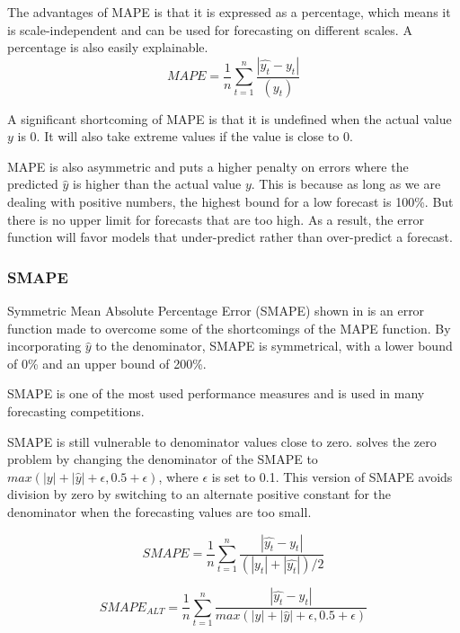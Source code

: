The advantages of MAPE is that it is expressed as a percentage, which means
it is scale-independent and can be used for forecasting on different scales.
A percentage is also easily explainable.
\begin{equation}
  \label{eq:Mape}
  MAPE = \frac{1}{n} \sum_{t=1}^n \frac{|\hat{y_t} - y_t|}{(y_t)}
\end{equation}

A significant shortcoming of MAPE is that it is undefined when the actual value $y$ is 0.
It will also take extreme values if the value is close to 0.

MAPE is also asymmetric and puts a higher penalty on errors where the predicted
$\hat{y}$ is higher than the actual value $y$.
This is because as long as we are dealing with positive numbers,
the highest bound for a low forecast is 100\%. But there is no upper limit
for forecasts that are too high. As a result, the error function will
favor models that under-predict rather than over-predict a forecast.

\subsubsection{SMAPE}
Symmetric Mean Absolute Percentage Error (SMAPE) shown in 
is an error function made to overcome some of the shortcomings of the MAPE function.
By incorporating $\hat{y}$ to the denominator, SMAPE is symmetrical,
with a lower bound of 0\% and an upper bound of 200\%.

SMAPE is one of the most used performance measures and is used in many forecasting competitions.

SMAPE is still vulnerable to denominator values close to zero.
\cite{Hewamalage2021} solves the zero problem by changing the denominator
of the SMAPE to $max(|y| + |\hat{y}| + \epsilon, 0.5 + \epsilon)$, where $\epsilon$
is set to 0.1.
This version of SMAPE avoids division by zero by switching to an alternate positive
constant for the denominator when the forecasting values are too small.


\begin{equation}
  \label{eq:sMape}
  SMAPE = \frac{1}{n} \sum_{t=1}^n \frac{|\hat{y_t} - y_t|}{(|y_t| + |\hat{y_t}|) / 2}
\end{equation}

\begin{equation}
  \label{eq:sMape-zero-division-alt}
  SMAPE_{ALT} = \frac{1}{n} \sum_{t=1}^n \frac{|\hat{y_t} - y_t|}{max(|y| + |\hat{y}| + \epsilon, 0.5 + \epsilon)}
\end{equation}

